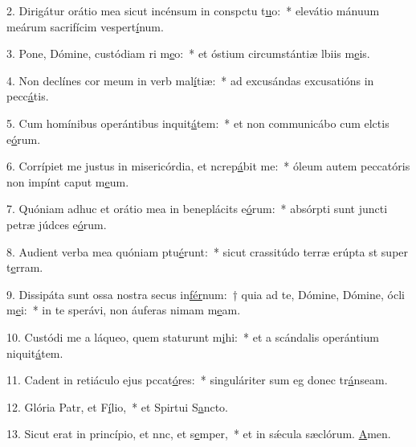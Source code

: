 2. Dirigátur orátio mea sicut incénsum in conspctu t\uline{u}o:~* elevátio mánuum meárum sacrifícim vespert\uline{í}num.\par 
3. Pone, Dómine, custódiam ri m\uline{e}o:~* et óstium circumstántiæ lbiis m\uline{e}is.\par 
4. Non declínes cor meum in verb mal\uline{í}tiæ:~* ad excusándas excusatións in pecc\uline{á}tis.\par 
5. Cum homínibus operántibus inquit\uline{á}tem:~* et non communicábo cum elctis e\uline{ó}rum.\par 
6. Corrípiet me justus in misericórdia, et ncrep\uline{á}bit me:~* óleum autem peccatóris non impínt caput m\uline{e}um.\par 
7. Quóniam adhuc et orátio mea in beneplácits e\uline{ó}rum:~* absórpti sunt juncti petræ júdces e\uline{ó}rum.\par 
8. Audient verba mea quóniam ptu\uline{é}runt:~* sicut crassitúdo terræ erúpta st super t\uline{e}rram.\par 
9. Dissipáta sunt ossa nostra secus in\uline{fér}num:~† quia ad te, Dómine, Dómine, ócli m\uline{e}i:~* in te sperávi, non áuferas nimam m\uline{e}am.\par 
10. Custódi me a láqueo, quem staturunt m\uline{i}hi:~* et a scándalis operántium niquit\uline{á}tem.\par 
11. Cadent in retiáculo ejus pccat\uline{ó}res:~* singuláriter sum eg donec tr\uline{á}nseam.\par 
12. Glória Patr, et F\uline{í}lio,~* et Spirtui S\uline{a}ncto.\par 
13. Sicut erat in princípio, et nnc, et s\uline{e}mper,~* et in sǽcula sæclórum. \uline{A}men.\par 

